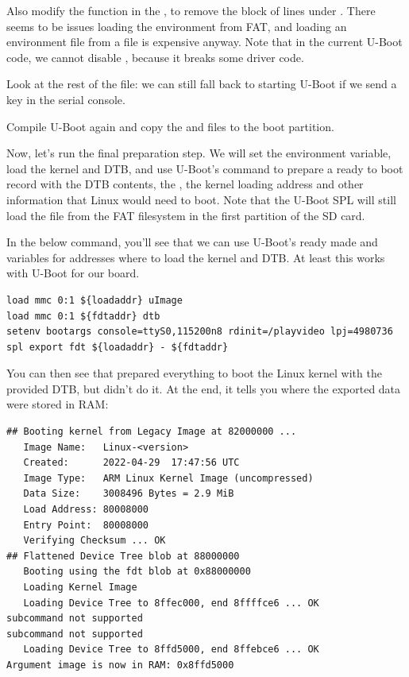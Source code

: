 Also modify the  function in the
, to remove the block
of lines under . There seems to be
issues loading the environment from FAT, and loading an environment file
from a file is expensive anyway. Note that in the current U-Boot code,
we cannot disable , because
it breaks some driver code.

Look at the rest of the  file:
we can still fall back to starting U-Boot if we send a  key
in the serial console.

Compile U-Boot again and copy the  and 
files to the boot partition.

Now, let's run the final preparation step. We will set the
 environment variable, load the kernel and DTB, and
use U-Boot's  command to prepare a ready to boot record
with the DTB contents, the , the kernel loading address
and other information that Linux would need to boot. Note that the
U-Boot SPL will still load the  file from the FAT
filesystem in the first partition of the SD card.

In the below command, you'll see that we can use U-Boot's ready made
 and  variables for addresses where to load
the kernel and DTB. At least this works with U-Boot for our board.

\begin{verbatim}
load mmc 0:1 ${loadaddr} uImage
load mmc 0:1 ${fdtaddr} dtb
setenv bootargs console=ttyS0,115200n8 rdinit=/playvideo lpj=4980736
spl export fdt ${loadaddr} - ${fdtaddr}
\end{verbatim}

You can then see that  prepared everything to boot the
Linux kernel with the provided DTB, but didn't do it. At the end, it
tells you where the exported data were stored in RAM:

\begin{verbatim}
## Booting kernel from Legacy Image at 82000000 ...
   Image Name:   Linux-<version>
   Created:      2022-04-29  17:47:56 UTC
   Image Type:   ARM Linux Kernel Image (uncompressed)
   Data Size:    3008496 Bytes = 2.9 MiB
   Load Address: 80008000
   Entry Point:  80008000
   Verifying Checksum ... OK
## Flattened Device Tree blob at 88000000
   Booting using the fdt blob at 0x88000000
   Loading Kernel Image
   Loading Device Tree to 8ffec000, end 8ffffce6 ... OK
subcommand not supported
subcommand not supported
   Loading Device Tree to 8ffd5000, end 8ffebce6 ... OK
Argument image is now in RAM: 0x8ffd5000
\end{verbatim}

